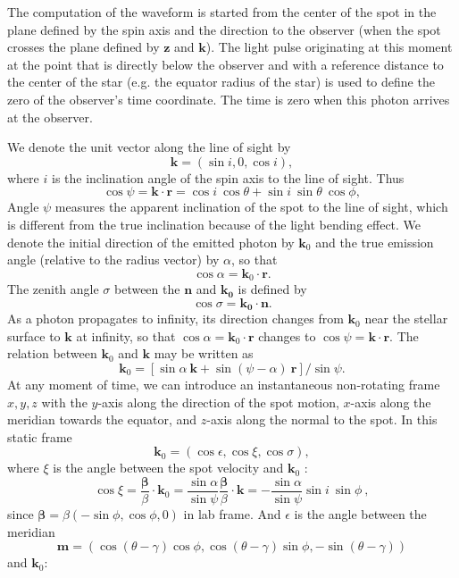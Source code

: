 \documentclass{wihuri}
\def\be{\begin{equation}}
\def\ee{\end{equation}}
\newcommand{\bmath}[1]{\boldsymbol{#1}}
\begin{document}
The computation of the waveform is started from the center of the spot in the plane defined by the spin axis and the direction to the observer 
(when the spot crosses the plane defined by $\bmath{z}$ and $\bmath{k}$). The light pulse originating at this moment at the point that is directly below the observer and with a reference distance to the center of the star (e.g. the equator radius of the star) is used to define the zero of the observer's time coordinate. The time is zero when this photon arrives at the observer. 



We denote the unit vector along the line of sight by 
\be
\bmath{k}=(\sin i, 0, \cos i), 
\ee 
where $i$ is the inclination angle of the spin axis to the line of sight. 
Thus 
\be \label{eq:psi2}
  \cos\psi=\bmath{k}\cdot \bmath{r} = \cos i\ \cos\theta+\sin i\ \sin \theta\ \cos\phi,
\ee
Angle $\psi$ measures the apparent inclination of the spot to the line of
sight, which is different from the true inclination because of
the light bending effect. %
We denote the initial direction of the emitted photon by $\bmath{k}_0$ %
and the true emission angle (relative to the radius vector) by $\alpha$, so that
\be
 \cos\alpha=\bmath{k}_0 \cdot \bmath{r}.
\ee
The zenith angle $\sigma$ between the $\bmath{n}$ and $\bmath{k_{0}}$ is defined by 
\be
\cos\sigma = \bmath{k_{0}}\cdot\bmath{n}.
\ee
As a photon propagates to infinity, its direction changes from
$\bmath{k}_0$ near the stellar surface to $\bmath{k}$ at infinity,
so that $\cos\alpha=\bmath{k}_0\cdot\bmath{r}$
changes to $\cos\psi=\bmath{k}\cdot\bmath{r}$.
The relation between $\bmath{k}_0$ and $\bmath{k}$ may be written as
\be\label{eq:k02}
\bmath{k}_0=[ \sin\alpha\ \bmath{k} +\sin(\psi-\alpha)\ \bmath{r}]/\sin\psi.
\ee
At any moment of time, we can introduce an instantaneous non-rotating frame $x,y,z$ 
with the $y$-axis along the direction of the spot motion, 
$x$-axis along the meridian towards the equator, and 
$z$-axis along the normal  to the spot.
In this static frame 
\be 
\bmath{k}_0=
\left( 
\cos \epsilon,
\cos\xi, 
\cos\sigma
\right) ,
\ee 
where $\xi$ is the angle  between the spot velocity and $\bmath{k}_0$ :   
\be \label{eq:cosxi22}
\cos\xi=\frac{\bmath{\beta}}{\beta} \cdot \bmath{k}_0
=\frac{\sin\alpha}{\sin\psi} \frac{\bmath{\beta}}{\beta} \cdot \bmath{k}=
- \frac{\sin\alpha}{\sin\psi}\sin i\ \sin\phi\ ,
\ee
since $\bmath{\beta} = \beta(-\sin\phi,\cos\phi,0)$ in lab frame. And $\epsilon$ is the angle between the meridian 
\be
 \bmath{m} = (\cos(\theta - \gamma)\cos \phi ,\cos (\theta -\gamma)\sin \phi, -\sin (\theta -\gamma))
\ee
and $\bmath{k}_0$: 
\end{document}
